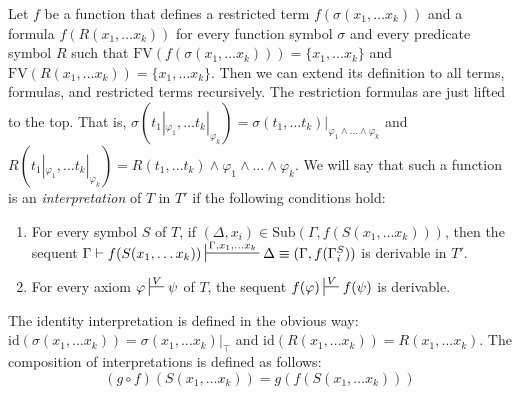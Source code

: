 \documentclass[reqno]{amsart}
\theoremstyle{definition}
\theoremstyle{remark}
\newcommand{\fs}[1]{\mathrm{#1}}
\newcommand{\FV}{\fs{FV}}
\newcommand{\sub}{\fs{Sub}}
\newcommand{\id}{\fs{id}}
\numberwithin{figure}{section}
\begin{document}
Let $f$ be a function that defines a restricted term $f(\sigma(x_1, \ldots x_k))$ and a formula $f(R(x_1, \ldots x_k))$ for every function symbol $\sigma$ and every predicate symbol $R$ such that $\FV(f(\sigma(x_1, \ldots x_k))) = \{ x_1, \ldots x_k \}$ and $\FV(R(x_1, \ldots x_k)) = \{ x_1, \ldots x_k \}$.
Then we can extend its definition to all terms, formulas, and restricted terms recursively.
The restriction formulas are just lifted to the top.
That is, $\sigma(t_1|_{\varphi_1}, \ldots t_k|_{\varphi_k}) = \sigma(t_1, \ldots t_k)|_{\varphi_1 \land \ldots \land \varphi_k}$ and $R(t_1|_{\varphi_1}, \ldots t_k|_{\varphi_k}) = R(t_1, \ldots t_k) \land \varphi_1 \land \ldots \land \varphi_k$.
We will say that such a function is an \emph{interpretation} of $T$ in $T'$ if the following conditions hold:
\begin{enumerate}
\item \label{it:interp-symb} For every symbol $S$ of $T$, if $(\Delta,x_i) \in \sub(\Gamma,f(S(x_1, \ldots x_k)))$, then the sequent $\Gamma \vdash f(S(x_1, \ldots x_k)) \sststile{}{\Gamma, x_1, \ldots x_k} \Delta \equiv (\Gamma,f(\Gamma^S_i))$ is derivable in $T'$.
\item \label{it:interp-axiom} For every axiom $\varphi \sststile{}{V} \psi$ of $T$, the sequent $f(\varphi) \sststile{}{V} f(\psi)$ is derivable.
\end{enumerate}

The identity interpretation is defined in the obvious way: $\id(\sigma(x_1, \ldots x_k)) = \sigma(x_1, \ldots x_k)|_\top$ and $\id(R(x_1, \ldots x_k)) = R(x_1, \ldots x_k)$.
The composition of interpretations is defined as follows:
\[ (g \circ f)(S(x_1, \ldots x_k)) = g(f(S(x_1, \ldots x_k))) \]
\end{document}

